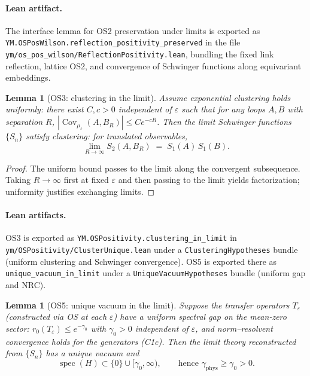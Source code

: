 \documentclass[11pt]{amsart}
\theoremstyle{plain}
\newtheorem{lemma}[theorem]{Lemma}
\theoremstyle{definition}
\theoremstyle{remark}
\begin{document}
\paragraph{Lean artifact.}
The interface lemma for OS2 preservation under limits is exported as
\texttt{YM.OSPosWilson.reflection\_positivity\_preserved} in the file
\texttt{ym/os\_pos\_wilson/ReflectionPositivity.lean}, bundling the fixed link
reflection, lattice OS2, and convergence of Schwinger functions along
equivariant embeddings.

\begin{lemma}[OS3: clustering in the limit]
Assume exponential clustering holds uniformly: there exist $C,c>0$ independent of $\varepsilon$ such that for any loops $A,B$ with separation $R$, $|\operatorname{Cov}_{\mu_\varepsilon}(A,B_R)|\le C e^{-cR}$. Then the limit Schwinger functions $\{S_n\}$ satisfy clustering: for translated observables,
\[
  \lim_{R\to\infty} S_2(A,B_R)\;=\;S_1(A)\,S_1(B).
\]
\end{lemma}

\begin{proof}
The uniform bound passes to the limit along the convergent subsequence. Taking $R\to\infty$ first at fixed $\varepsilon$ and then passing to the limit yields factorization; uniformity justifies exchanging limits.
\end{proof}

\paragraph{Lean artifacts.}
OS3 is exported as \texttt{YM.OSPositivity.clustering\_in\_limit} in
\texttt{ym/OSPositivity/ClusterUnique.lean} under a \texttt{ClusteringHypotheses}
bundle (uniform clustering and Schwinger convergence). OS5 is exported there as
\texttt{unique\_vacuum\_in\_limit} under a \texttt{UniqueVacuumHypotheses}
bundle (uniform gap and NRC).

\begin{lemma}[OS5: unique vacuum in the limit]
Suppose the transfer operators $T_{\varepsilon}$ (constructed via OS at each $\varepsilon$) have a uniform spectral gap on the mean-zero sector: $r_0(T_{\varepsilon})\le e^{-\gamma_0}$ with $\gamma_0>0$ independent of $\varepsilon$, and norm--resolvent convergence holds for the generators (C1c). Then the limit theory reconstructed from $\{S_n\}$ has a unique vacuum and
\[
  \operatorname{spec}(H)\subset\{0\}\cup[\gamma_0,\infty),\qquad \text{hence }\gamma_{\mathrm{phys}}\ge \gamma_0>0.
\]
\end{lemma}
\end{document}
